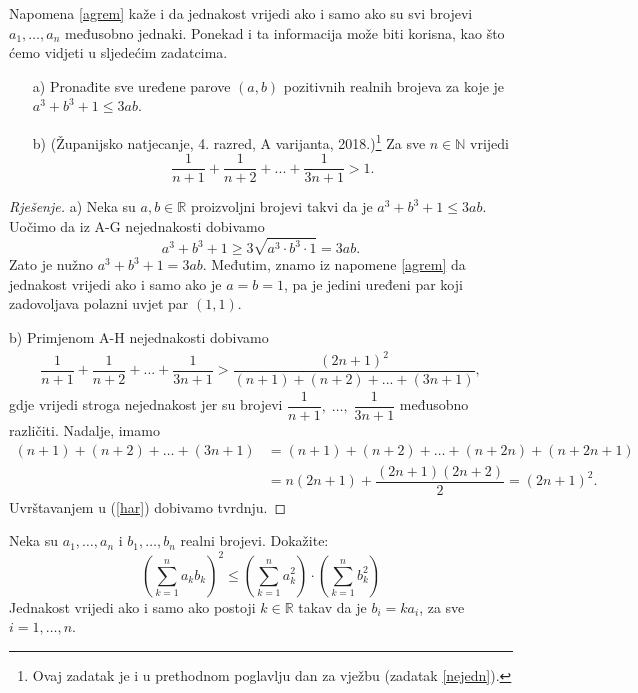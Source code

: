Napomena \ref{agrem} kaže i da jednakost vrijedi ako i samo ako su svi brojevi $a_1, \dots, a_n$ međusobno jednaki. Ponekad i ta informacija može biti korisna, kao što ćemo vidjeti u sljedećim zadatcima.
\begin{exercise} \textbf{}
\begin{itemize}
\item[a)] Pronađite sve uređene parove $(a, b)$ pozitivnih realnih brojeva za koje je $a^3+b^3+1\leq 3ab$.
\item[b)] (Županijsko natjecanje, 4. razred, A varijanta, 2018.)\footnote{Ovaj zadatak je i u prethodnom poglavlju dan za vježbu (zadatak \ref{nejedn}).} Za sve $n\in \mathbb{N}$ vrijedi $$\dfrac{1}{n+1}+\dfrac{1}{n+2}+...+\dfrac{1}{3n+1}>1.$$
\end{itemize}
\end{exercise}
\begin{proof}[Rješenje]
a) Neka su $a, b\in \mathbb{R}$ proizvoljni brojevi takvi da je $a^3+b^3+1\leq 3ab$. Uočimo da iz A-G nejednakosti dobivamo $$a^3+b^3+1\geq 3\sqrt{a^3\cdot b^3\cdot 1}=3ab.$$
Zato je nužno $a^3+b^3+1=3ab$. Međutim, znamo iz napomene \ref{agrem} da jednakost vrijedi ako i samo ako je $a=b=1$, pa je jedini uređeni par koji zadovoljava polazni uvjet par $(1, 1)$.

b) Primjenom A-H nejednakosti dobivamo
\begin{align}
\label{har}
\dfrac{1}{n+1}+\dfrac{1}{n+2}+...+\dfrac{1}{3n+1}>\dfrac{(2n+1)^2}{(n+1)+(n+2)+...+(3n+1)},   
\end{align}
gdje vrijedi stroga nejednakost jer su brojevi $\dfrac{1}{n+1},\; \dots,\; \dfrac{1}{3n+1}$ međusobno različiti. Nadalje, imamo
\begin{align*}
(n+1)+(n+2)+\dots+(3n+1)&=(n+1)+(n+2)+\dots+(n+2n)+(n+2n+1)\\
&=n(2n+1)+\dfrac{(2n+1)(2n+2)}{2}=(2n+1)^2.
\end{align*}
Uvrštavanjem u (\ref{har}) dobivamo tvrdnju.
\end{proof}
\begin{exercise}
Neka su $a_1, \dots, a_n$ i $b_1, \dots, b_n$ realni brojevi. Dokažite:
$$\left(\sum_{k=1}^n{a_kb_k}\right)^2\leq \left(\sum_{k=1}^n{a_k^2}\right)\cdot\left(\sum_{k=1}^n{b_k^2}\right)$$
Jednakost vrijedi ako i samo ako postoji $k\in \mathbb{R}$ takav da je $b_i=ka_i$, za sve $i=1, \dots, n$.
\end{exercise}

